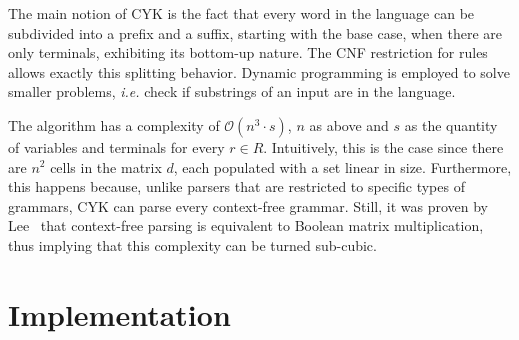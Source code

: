 \documentclass[12pt]{article}
\begin{document}
The main notion of CYK is the fact that every word in the language can be subdivided into a prefix and a suffix, starting with the base case, when there are only terminals, exhibiting its bottom-up nature. The CNF restriction for rules allows exactly this splitting behavior. Dynamic programming is employed to solve smaller problems, \emph{i.e.} check if substrings of an input are in the language.

The algorithm has a complexity of $\mathcal{O}(n^{3} \cdot s)$, $n$ as above and $s$ as the quantity of variables and terminals for every $r \in R$. Intuitively, this is the case since there are $n^{2}$ cells in the matrix $d$, each populated with a set linear in size. Furthermore, this happens because, unlike parsers that are restricted to specific types of grammars, CYK can parse every context-free grammar. Still, it was proven by Lee~\cite{} that context-free parsing is equivalent to Boolean matrix multiplication, thus implying that this complexity can be turned sub-cubic.

\section{Implementation}\label{sec:imp}



\end{document}
